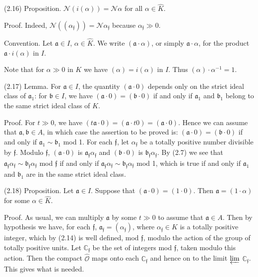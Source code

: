 \documentclass[11pt]{article}
\begin{document}
\par
(2.16) Proposition. \(\mathcal{N}(i(\alpha ))=\mathcal{N}\alpha \) for all \(\alpha \in \widehat{K}\).\par
\par
Proof. Indeed, \(\mathcal{N}((\alpha _{𝔣}))=\mathcal{N}\alpha _{𝔣}\) because \(\alpha _{𝔣}\gg 0\).\par
\par
Convention. Let \(𝔞\in I\), \(\alpha \in \widehat{K}\). We write \((𝔞\cdot \alpha )\), or simply \(𝔞\cdot \alpha \), for the product \(𝔞\cdot i(\alpha )\) in \(I\).\par
\par
Note that for \(\alpha \gg 0\) in \(K\) we have \((\alpha )=i(\alpha )\) in \(I\). Thus \((\alpha )\cdot \alpha ^{-1}=1\).\par
\par
(2.17) Lemma. For \(𝔞\in I\), the quantity \((𝔞\cdot 0)\) depends only on the strict ideal class of \(𝔞_{1}\): for \(𝔟\in I\), we have \((𝔞\cdot 0)=(𝔟\cdot 0)\) if and only if \(𝔞_{1}\) and \(𝔟_{1}\) belong to the same strict ideal class of \(K\).\par
\par
Proof. For \(t\gg 0\), we have \((t𝔞\cdot 0)=(𝔞\cdot t0)=(𝔞\cdot 0)\). Hence we can assume that \(𝔞,𝔟\in A\), in which case the assertion to be proved is: \((𝔞\cdot 0)=(𝔟\cdot 0)\) if and only if \(𝔞_{1}\sim 𝔟_{1}\) mod 1. For each \(𝔣\), let \(\alpha _{𝔣}\) be a totally positive number divisible by \(𝔣\). Modulo \(𝔣\), \((𝔞\cdot 0)\) is \(𝔞_{𝔣}\alpha _{𝔣}\) and \((𝔟\cdot 0)\) is \(𝔟_{𝔣}\alpha _{𝔣}\). By (2.7) we see that \(𝔞_{𝔣}\alpha _{𝔣}\sim 𝔟_{𝔣}\alpha _{𝔣}\) mod \(𝔣\) if and only if \(𝔞_{𝔣}\alpha _{𝔣}\sim 𝔟_{𝔣}\alpha _{𝔣}\) mod 1, which is true if and only if \(𝔞_{1}\) and \(𝔟_{1}\) are in the same strict ideal class.\par
\par
(2.18) Proposition. Let \(𝔞\in I\). Suppose that \((𝔞\cdot 0)=(1\cdot 0)\). Then \(𝔞=(1\cdot \alpha )\) for some \(\alpha \in \widehat{K}\).\par
\par
Proof. As usual, we can multiply \(𝔞\) by some \(t\gg 0\) to assume that \(𝔞\in A\). Then by hypothesis we have, for each \(𝔣\), \(𝔞_{𝔣}=(\alpha _{𝔣})\), where \(\alpha _{𝔣}\in K\) is a totally positive integer, which by (2.14) is well defined, mod \(𝔣\), modulo the action of the group of totally positive units. Let \(\mathbb{C}_{𝔣}\) be the set of integers mod \(𝔣\), taken modulo this action. Then the compact \(\widehat{\mathcal{O}}\) maps onto each \(\mathbb{C}_{𝔣}\) and hence on to the limit \(\varprojlim \) \(\mathbb{C}_{𝔣}\). This gives what is needed.\par
\end{document}
